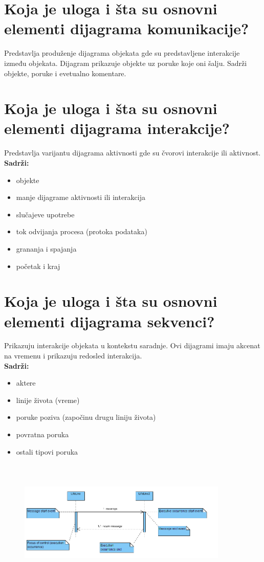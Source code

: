 \documentclass[a4paper]{article}
\begin{document}
\section{Koja je uloga i šta su osnovni elementi dijagrama komunikacije?}
  Predstavlja produženje dijagrama objekata gde su predstavljene interakcije između objekata.
  Dijagram prikazuje objekte uz poruke koje oni šalju. Sadrži objekte, poruke i evetualno komentare.

\section{Koja je uloga i šta su osnovni elementi dijagrama interakcije?}
  Predstavlja varijantu dijagrama aktivnosti gde su čvorovi interakcije ili aktivnost.\\
  \textbf{Sadrži:}
  \begin{itemize}
    \item objekte
    \item manje dijagrame aktivnosti ili interakcija
    \item slučajeve upotrebe
    \item tok odvijanja procesa (protoka podataka)
    \item grananja i spajanja
    \item početak i kraj
  \end{itemize}

\section{Koja je uloga i šta su osnovni elementi dijagrama sekvenci?}
  Prikazuju interakcije objekata u kontekstu saradnje. Ovi dijagrami imaju akcenat na vremenu i
  prikazuju redosled interakcija.\\
  \textbf{Sadrži:}
  \begin{itemize}
    \item aktere
    \item linije života (vreme)
    \item poruke poziva (započinu drugu liniju života)
    \item povratna poruka
    \item ostali tipovi poruka
  \end{itemize}
  \begin{figure}[H]
    \begin{center}
        \includegraphics[width=100mm,height=60mm]{Slike/uml_sekvenci.png}
    \end{center}
  \end{figure} 
\end{document}
